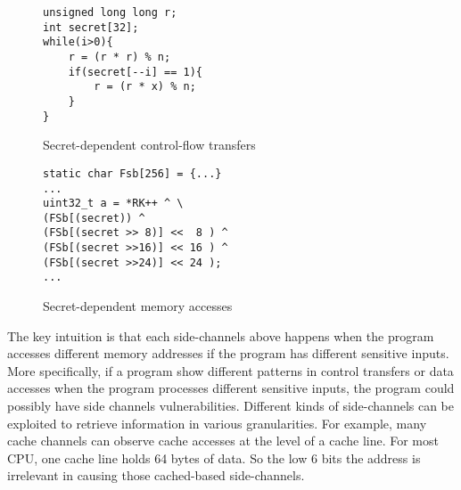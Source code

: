 \begin{figure}[]

    \noindent\begin{minipage}{0.45\linewidth}
        \noindent
        \begin{lstlisting}[numbers = none]
unsigned long long r;
int secret[32];
while(i>0){
    r = (r * r) % n;
    if(secret[--i] == 1){
        r = (r * x) % n;
    }
}
\end{lstlisting}
        \caption{Secret-dependent control-flow transfers}
    \end{minipage}
    \hfill
    \begin{minipage}{0.45\linewidth}
        \begin{lstlisting}[numbers = none]
static char Fsb[256] = {...}
... 
uint32_t a = *RK++ ^ \ 
(FSb[(secret)) ^
(FSb[(secret >> 8)] <<  8 ) ^
(FSb[(secret >>16)] << 16 ) ^
(FSb[(secret >>24)] << 24 );
...
\end{lstlisting}
        \caption{Secret-dependent memory accesses}
    \end{minipage}
\end{figure}

The key intuition is that each side-channels above happens when the program
accesses different memory addresses if the program has different sensitive
inputs. More specifically, if a program show different patterns in control
transfers or data accesses when the program processes different sensitive
inputs, the program could possibly have side channels vulnerabilities. Different
kinds of side-channels can be exploited to retrieve information in various
granularities. For example, many cache channels can observe cache accesses at
the level of a cache line. For most CPU, one cache line holds 64 bytes of data.
So the low 6 bits the address is irrelevant in causing those cached-based
side-channels.

%



